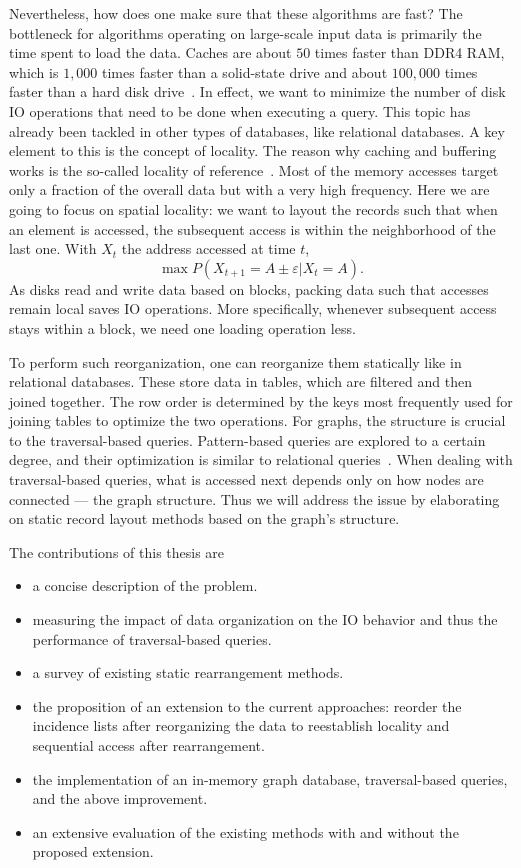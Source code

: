 Nevertheless, how does one make sure that these algorithms are fast?
The bottleneck for algorithms operating on large-scale input data is primarily the time spent to load the data. 
Caches are about $50$ times faster than DDR4 RAM, which is $1,000$ times faster than a solid-state drive and about $100,000$ times faster than a hard disk drive~\autocite{mem-h}.
In effect, we want to minimize the number of disk IO operations that need to be done when executing a query.
This topic has already been tackled in other types of databases, like relational databases.
A key element to this is the concept of locality. 
The reason why caching and buffering works is the so-called locality of reference~\autocite{tanenbaum2015modern, jacob2010memory}. 
Most of the memory accesses target only a fraction of the overall data but with a very high frequency. 
Here we are going to focus on spatial locality: 
we want to layout the records such that when an element is accessed, the subsequent access is within the neighborhood of the last one.
With $X_t$ the address accessed at time $t$,
\[ \max P(X_{t+1} = A \pm \varepsilon | X_t = A). \]
As disks read and write data based on blocks, packing data such that accesses remain local saves IO operations. 
More specifically, whenever subsequent access stays within a block, we need one loading operation less.

To perform such reorganization, one can reorganize them statically like in relational databases. 
These store data in tables, which are filtered and then joined together. 
The row order is determined by the keys most frequently used for joining tables to optimize the two operations.
For graphs, the structure is crucial to the traversal-based queries.
Pattern-based queries are explored to a certain degree, and their optimization is similar to relational queries~\autocite{Gubichev2015QueryPA}.
When dealing with traversal-based queries, what is accessed next depends only on how nodes are connected --- the graph structure. 
Thus we will address the issue by elaborating on static record layout methods based on the graph's structure.

\newpage
The contributions of this thesis are 
\begin{itemize}
 \item a concise description of the problem.
 \item measuring the impact of data organization on the IO behavior and thus the performance of traversal-based queries.
 \item a survey of existing static rearrangement methods.
 \item the proposition of an extension to the current approaches: 
 reorder the incidence lists after reorganizing the data to reestablish locality and sequential access after rearrangement.
 \item the implementation of an in-memory graph database, traversal-based queries, and the above improvement.
 \item an extensive evaluation of the existing methods with and without the proposed extension.
\end{itemize}

